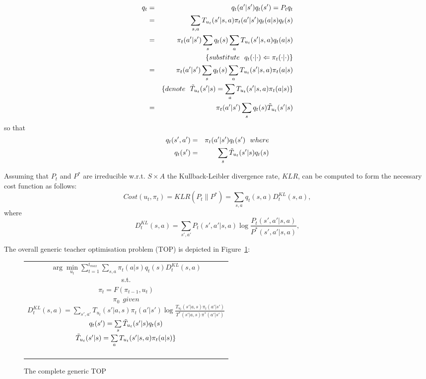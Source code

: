 \documentclass[letterpaper]{aamas2009}
\begin{document}
\begin{eqnarray*}
q_t&=&q_t(a'|s')q_t(s')=P_tq_t\\
&=&\sum\limits_{s,a}T_{u_t}(s'|s,a)\pi_t(a'|s')q_t(a|s)q_t(s)\\
&=&\pi_t(a'|s')\sum\limits_sq_t(s)\sum\limits_aT_{u_t}(s'|s,a)q_t(a|s)\\
&&\{\displaystyle{substitute}\ \ q_t(\cdot|\cdot)\Leftarrow\pi_t(\cdot|\cdot)\}\\
&=&\pi_t(a'|s')\sum\limits_sq_t(s)\sum\limits_aT_{u_t}(s'|s,a)\pi_t(a|s)\\
&&\{\displaystyle{denote}\ \ \Tilde{T}_{u_t}(s'|s)=\sum\limits_aT_{u_t}(s'|s,a)\pi_t(a|s)\}\\
&=&\pi_t(a'|s')\sum\limits_sq_t(s)\Tilde{T}_{u_t}(s'|s)
\end{eqnarray*}
so that
\begin{eqnarray*}
q_t(s',a')&=&\pi_t(a'|s')q_t(s')\ \ \displaystyle{where}\\
q_t(s')&=&\sum\limits_s\Tilde{T}_{u_t}(s'|s)q_t(s)
\end{eqnarray*}

Assuming that $P_t$ and $P^*$ are irreducible w.r.t. $S\times A$ the
Kullback-Leibler divergence rate, $KLR$, can be computed to form the
necessary cost function as follows:
$$
Cost(u_t,\pi_t)=KLR(P_t\|P^*)=\sum\limits_{s,a}q_t(s,a)D^{KL}_t(s,a),$$
where $$D^{KL}_t(s,a)=\sum\limits_{s',a'}P_t(s',a'|s,a)\log\frac{P_t(s',a'|s,a)}{P^*(s',a'|s,a)},
$$

The overall generic teacher optimisation problem (TOP) is depicted in Figure~\ref{t_opt}:
\begin{figure}[ht]
\begin{tabular}{|c|} \hline \parbox{3.2 in} {\center 
$\arg\min\limits_{u_t}\sum\limits_{t=1}^{t_{max}}\sum\limits_{s,a}\pi_t(a|s)q_t(s)D^{KL}_t(s,a)$\\
s.t.\\
$\pi_t=F(\pi_{t-1},u_t)$\\
$\pi_0\ \ \displaystyle{given}$\\
$D^{KL}_t(s,a)=\sum\limits_{s',a'}T_{u_t}(s'|a,s)\pi_t(a'|s')\log\frac{T_{u_t}(s'|a,s)\pi_t(a'|s')}{T^*(s'|a,s)\pi^*(a'|s')}$\\
$q_t(s')=\sum\limits_s\Tilde{T}_{u_t}(s'|s)q_t(s)$\\
$\Tilde{T}_{u_t}(s'|s)=\sum\limits_aT_{u_t}(s'|s,a)\pi_t(a|s)\}$\\\ \\
}\\ \hline \end{tabular}
\caption{\label{t_opt}The complete generic TOP}
\end{figure}
\end{document}
